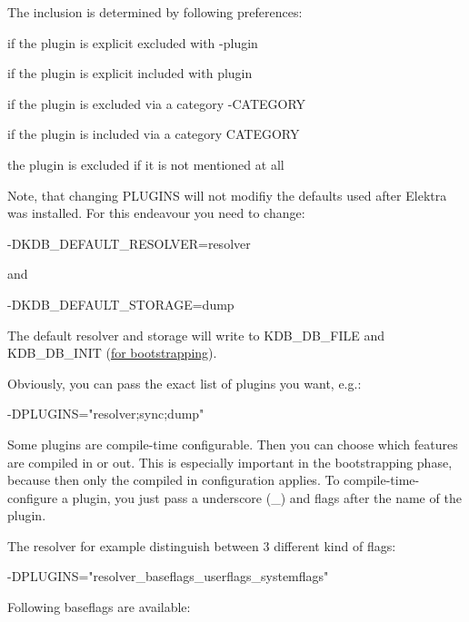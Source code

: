The inclusion is determined by following preferences\+:


\begin{DoxyEnumerate}
\item if the plugin is explicit excluded with {\ttfamily -\/plugin}
\item if the plugin is explicit included with {\ttfamily plugin}
\item if the plugin is excluded via a category {\ttfamily -\/\+C\+A\+T\+E\+G\+O\+R\+Y}
\item if the plugin is included via a category {\ttfamily C\+A\+T\+E\+G\+O\+R\+Y}
\item the plugin is excluded if it is not mentioned at all
\end{DoxyEnumerate}

Note, that changing {\ttfamily P\+L\+U\+G\+I\+N\+S} will not modifiy the defaults used after Elektra was installed. For this endeavour you need to change\+: \begin{DoxyVerb}-DKDB_DEFAULT_RESOLVER=resolver
\end{DoxyVerb}


and \begin{DoxyVerb}-DKDB_DEFAULT_STORAGE=dump
\end{DoxyVerb}


The default resolver and storage will write to {\ttfamily K\+D\+B\+\_\+\+D\+B\+\_\+\+F\+I\+L\+E} and {\ttfamily K\+D\+B\+\_\+\+D\+B\+\_\+\+I\+N\+I\+T} (\hyperlink{md_doc_help_elektra-bootstrapping_doc_help_elektra-bootstrapping_md}{for bootstrapping}).

Obviously, you can pass the exact list of plugins you want, e.\+g.\+: \begin{DoxyVerb}-DPLUGINS="resolver;sync;dump"
\end{DoxyVerb}


Some plugins are compile-\/time configurable. Then you can choose which features are compiled in or out. This is especially important in the bootstrapping phase, because then only the compiled in configuration applies. To compile-\/time-\/configure a plugin, you just pass a underscore ({\ttfamily \+\_\+}) and flags after the name of the plugin.

The resolver for example distinguish between 3 different kind of flags\+: \begin{DoxyVerb}-DPLUGINS="resolver_baseflags_userflags_systemflags"
\end{DoxyVerb}


Following baseflags are available\+:


